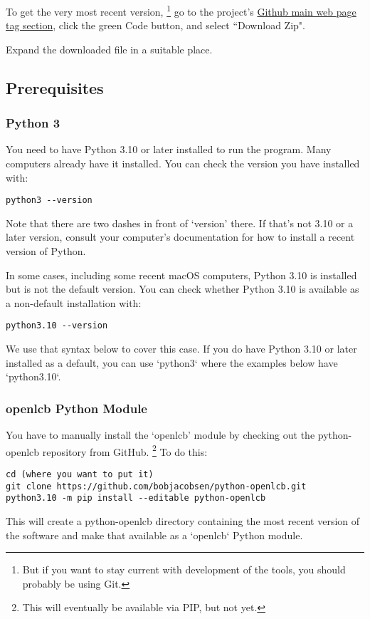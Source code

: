 To get the very most recent version,
\footnote{But if you want to stay current with development of the tools, you should probably be using Git.}
go to the project's
\href{https://github.com/bobjacobsen/OlcbChecker}{Github main web page tag section},
click the green Code button, and select ``Download Zip".

Expand the downloaded file in a suitable place.

\subsection{Prerequisites}

\subsubsection{Python 3}
You need to have Python 3.10 or later installed to run the program. 
Many computers already have it installed. 
You can check the version you have installed with:
\begin{verbatim}
python3 --version
\end{verbatim}
Note that there are two dashes in front of `version' there. If that's
not 3.10 or a later version, consult your
computer's documentation for how to install a recent version of Python. 

In some cases, including some recent macOS computers, Python 3.10 is installed but
is not the default version.  You can check whether Python 3.10 is available
as a non-default installation with:
\begin{verbatim}
python3.10 --version
\end{verbatim}
We use that syntax below to cover this case.  If you do have Python 3.10 or later 
installed as a default, you can use `python3` where the examples below have `python3.10`.

\subsubsection{openlcb Python Module}
You have to manually install the `openlcb' module by checking out the
python-openlcb repository from GitHub.
\footnote{This will eventually be available via PIP, but not yet.}
To do this:
\begin{verbatim}
cd (where you want to put it)
git clone https://github.com/bobjacobsen/python-openlcb.git
python3.10 -m pip install --editable python-openlcb
\end{verbatim}
This will create a python-openlcb directory containing the most recent version of the software
and make that available as a `openlcb` Python module.

